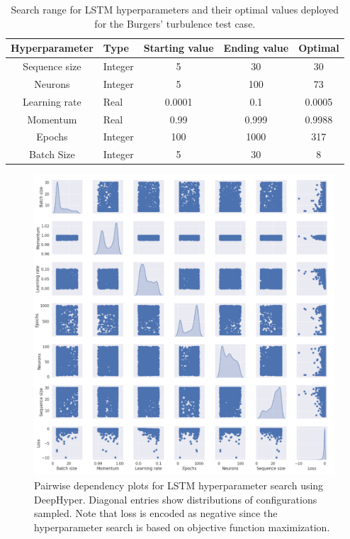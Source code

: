 \documentclass[preprint,12pt]{elsarticle}
\begin{document}
\begin{table}[]
\caption{Search range for LSTM hyperparameters and their optimal values deployed for the Burgers' turbulence test case.}
\label{Table1}
\begin{tabular}{|c|l|c|c|c|}
\hline
Hyperparameter & Type    & Starting value & Ending value & Optimal \\ \hline
Sequence size  & Integer & 5              & 30           & 30       \\ \hline
Neurons        & Integer & 5              & 100          & 73      \\ \hline
Learning rate  & Real    & 0.0001         & 0.1          & 0.0005 \\ \hline
Momentum       & Real    & 0.99           & 0.999        & 0.9988  \\ \hline
Epochs         & Integer & 100            & 1000         & 317     \\ \hline
Batch Size     & Integer & 5              & 30           & 8      \\ \hline
\end{tabular}
\end{table}

\begin{figure}
	\centering
	\includegraphics[width=\textwidth]{Figure_18.pdf}
	\caption{Pairwise dependency plots for LSTM hyperparameter search using DeepHyper. Diagonal entries show distributions of configurations sampled. Note that loss is encoded as negative since the hyperparameter search is based on objective function maximization.}
	\label{Figure13}
\end{figure}
\end{document}
